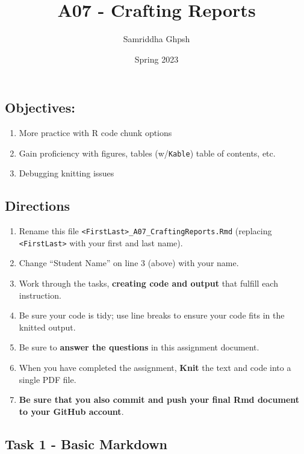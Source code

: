 \documentclass[
]{article}
\title{A07 - Crafting Reports}
\author{Samriddha Ghpsh}
\date{Spring 2023}
\providecommand{\tightlist}{%
  \setlength{\itemsep}{0pt}\setlength{\parskip}{0pt}}
\begin{document}
\maketitle

\hypertarget{objectives}{%
\subsection{Objectives:}\label{objectives}}

\begin{enumerate}
\def\labelenumi{\arabic{enumi}.}
\tightlist
\item
  More practice with R code chunk options
\item
  Gain proficiency with figures, tables (w/\texttt{Kable}) table of
  contents, etc.
\item
  Debugging knitting issues
\end{enumerate}

\hypertarget{directions}{%
\subsection{Directions}\label{directions}}

\begin{enumerate}
\def\labelenumi{\arabic{enumi}.}
\tightlist
\item
  Rename this file
  \texttt{\textless{}FirstLast\textgreater{}\_A07\_CraftingReports.Rmd}
  (replacing \texttt{\textless{}FirstLast\textgreater{}} with your first
  and last name).
\item
  Change ``Student Name'' on line 3 (above) with your name.
\item
  Work through the tasks, \textbf{creating code and output} that fulfill
  each instruction.
\item
  Be sure your code is tidy; use line breaks to ensure your code fits in
  the knitted output.
\item
  Be sure to \textbf{answer the questions} in this assignment document.
\item
  When you have completed the assignment, \textbf{Knit} the text and
  code into a single PDF file.
\item
  \textbf{Be sure that you also commit and push your final Rmd document
  to your GitHub account}.
\end{enumerate}

\hypertarget{task-1---basic-markdown}{%
\subsection{Task 1 - Basic Markdown}\label{task-1---basic-markdown}}
\end{document}
